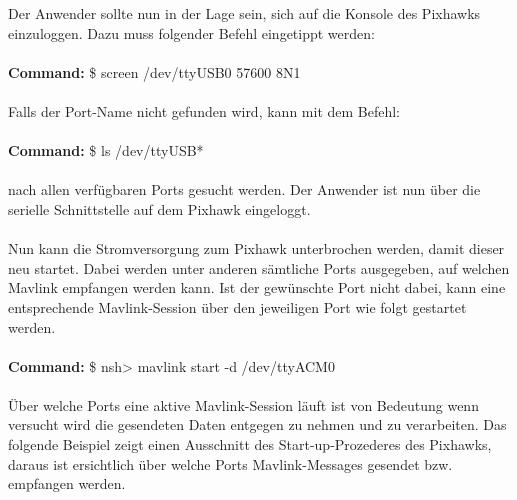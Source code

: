 \documentclass[12pt]{article} %
\begin{document}
	Der Anwender sollte nun in der Lage sein, sich auf die Konsole des Pixhawks einzuloggen. Dazu muss folgender Befehl eingetippt werden:\\
	\\
	\noindent\hspace*{30mm} \textbf{Command:} \$ screen /dev/ttyUSB0 57600 8N1\\
	\\		
	Falls der Port-Name nicht gefunden wird, kann mit dem Befehl:\\
	\\
	\noindent\hspace*{30mm} \textbf{Command:} \$ ls /dev/ttyUSB*\\
	\\
	nach allen verfügbaren Ports gesucht werden. Der Anwender ist nun über die serielle Schnittstelle auf dem Pixhawk eingeloggt.\\
	\\
	Nun kann die Stromversorgung zum Pixhawk unterbrochen werden, damit dieser neu startet. Dabei werden unter anderen sämtliche Ports ausgegeben, auf welchen Mavlink empfangen werden kann. Ist der gewünschte Port nicht dabei, kann eine entsprechende Mavlink-Session über den jeweiligen Port wie folgt gestartet werden.\\
	\\
	\noindent\hspace*{30mm} \textbf{Command:} \$ nsh> mavlink start -d /dev/ttyACM0\\
	\\
	Über welche Ports eine aktive Mavlink-Session läuft ist von Bedeutung wenn versucht wird die gesendeten Daten entgegen zu nehmen und zu verarbeiten. Das folgende Beispiel zeigt einen Ausschnitt des Start-up-Prozederes des Pixhawks, daraus ist ersichtlich über welche Ports Mavlink-Messages gesendet bzw. empfangen werden.
	
\end{document}
